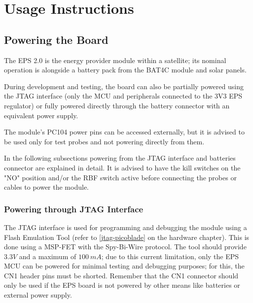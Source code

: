 %
%
%
%
%

%
%
%
%
%
%

\chapter{Usage Instructions} \label{ch:instructions}

\section{Powering the Board}

The EPS 2.0 is the energy provider module within a satellite; its nominal operation is alongside a battery pack from the BAT4C module and solar panels. 

During development and testing, the board can also be partially powered using the JTAG interface (only the MCU and peripherals connected to the 3V3 EPS regulator) or fully powered directly through the battery connector with an equivalent power supply.

The module's PC104 power pins can be accessed externally, but it is advised to be used only for test probes and not powering directly from them. 

In the following subsections powering from the JTAG interface and batteries connector are explained in detail. 
It is advised to have the kill switches on the "NO" position and/or the RBF switch active before connecting the probes or cables to power the module.

 
\subsection{Powering through JTAG Interface}

The JTAG interface is used for programming and debugging the module using a Flash Emulation Tool (refer to \autoref{jtag-picoblade} on the hardware chapter). 
This is done using a MSP-FET with the Spy-Bi-Wire protocol.
The tool should provide $3.3 V$ and a maximum of $100\ mA$; due to this current limitation, only the EPS MCU can be powered for minimal testing and debugging purposes; for this, the CN1 header pins must be shorted.
Remember that the CN1 connector should only be used if the EPS board is not powered by other means like batteries or external power supply.

